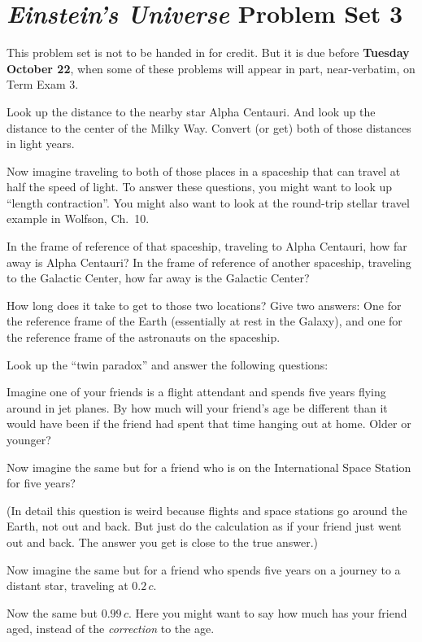 \documentclass[12pt, letterpaper]{article}
\begin{document}
\section*{\textsl{Einstein's Universe} Problem Set 3}

This problem set is not to be handed in for credit. But it is due
before \textbf{Tuesday October 22}, when some of these problems
will appear in part, near-verbatim, on Term Exam 3.

\begin{problem}
Look up the distance to the nearby star Alpha Centauri. And look up the
distance to the center of the Milky Way. Convert (or get) both of those
distances in light years.

Now imagine traveling to both of those places in a spaceship that can
travel at half the speed of light. To answer these questions, you
might want to look up ``length contraction''. You might also want to
look at the round-trip stellar travel example in Wolfson, Ch.~10.

In the frame of reference of that spaceship, traveling to Alpha
Centauri, how far away is Alpha Centauri? In the frame of reference of
another spaceship, traveling to the Galactic Center, how far away is
the Galactic Center?

How long does it take to get to those two locations? Give two answers:
One for the reference frame of the Earth (essentially at rest in the
Galaxy), and one for the reference frame of the astronauts on the
spaceship.
\end{problem}

\begin{problem}
Look up the ``twin paradox'' and answer the following questions:

Imagine one of your friends is a flight attendant and spends five years
flying around in jet planes. By how much will your friend's age be different
than it would have been if the friend had spent that time hanging out
at home. Older or younger?

Now imagine the same but for a friend who is on the International
Space Station for five years?

(In detail this question is weird because flights and space stations
go around the Earth, not out and back. But just do the calculation as
if your friend just went out and back. The answer you get is close to
the true answer.)

Now imagine the same but for a friend who spends five years on a journey
to a distant star, traveling at $0.2\,c$.

Now the same but $0.99\,c$. Here you might want to say how much has your
friend aged, instead of the \emph{correction} to the age.
\end{problem}
\end{document}
